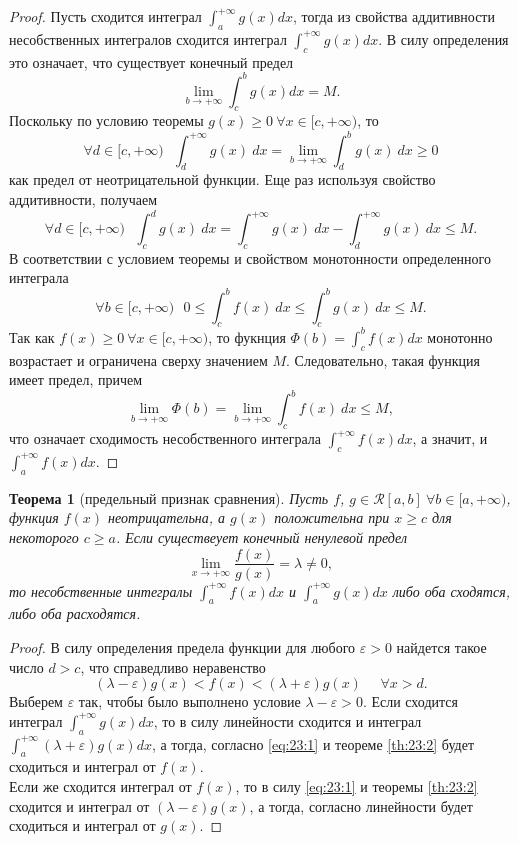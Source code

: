 \documentclass[12pt]{report}
\numberwithin{equation}{section}
\newtheorem{theorem}{Теорема}[section]
\begin{document}
\begin{proof}
Пусть сходится интеграл $\int_a^{+\infty}g(x)dx$, тогда из свойства аддитивности несобственных интегралов сходится интеграл $\int_c^{+\infty}g(x)dx$. В силу определения это означает, что существует конечный предел
\[ \lim_{b \to +\infty}\int_c^b g(x)dx = M.\]
Поскольку по условию теоремы $g(x) \geqslant 0~\forall x \in [c, +\infty)$, то
\[ \forall d \in [c, +\infty)~~~ \int_d^{+\infty} g(x)~dx = \lim_{b \to +\infty} \int_d^b g(x)~dx \geqslant 0\]
как предел от неотрицательной функции. Еще раз используя свойство аддитивности, получаем
\[ \forall d \in [c, +\infty)~~~ \int_c^d g(x)~dx = \int_c^{+\infty} g(x)~dx - \int_d^{+\infty} g(x)~dx \leqslant M.\]
В соответствии с условием теоремы и свойством монотонности определенного интеграла
\[ \forall b \in [c, +\infty)~~~ 0 \leqslant \int_c^b f(x)~dx \leqslant \int_c^b g(x)~dx \leqslant M.\]
Так как $f(x) \geqslant 0~\forall x \in [c,+\infty)$, то фукнция $\Phi(b) = \int_c^b f(x)dx$ монотонно возрастает и ограничена сверху значением $M$. Следовательно, такая функция имеет предел, причем
\[ \lim_{b \to +\infty} \Phi(b) = \lim_{b \to +\infty} \int_c^b f(x)~dx \leqslant M, \]
что означает сходимость несобственного интеграла $\int_c^{+\infty}f(x)dx$, а значит, и $\int_a^{+\infty}f(x)dx$.
\end{proof}

\begin{theorem} [предельный признак сравнения] \label{th:23:3}
Пусть $f$, $g \in \mathcal{R}[a,b]~\forall b \in [a, + \infty)$, функция $f(x)$ неотрицательна, а $g(x)$ положительна при $x \geqslant c$ для некоторого $c \geqslant a$. Если существеует конечный ненулевой предел
\[ \lim_{x \to + \infty} \frac{f(x)}{g(x)} = \lambda \neq 0,\]
то несобственные интегралы $\int_a^{+ \infty} f(x)dx$ и $\int_a^{+ \infty} g(x)dx$ либо оба сходятся, либо оба расходятся.
\end{theorem}
\begin{proof}
 В силу определения предела функции для любого $\varepsilon > 0$ найдется такое  число $d > c$, что справедливо неравенство
\begin{equation} \label {eq:23:1}
(\lambda - \varepsilon) g(x) < f(x) < (\lambda + \varepsilon) g(x)~~~~~~\forall x > d.
\end{equation}
Выберем $\varepsilon$ так, чтобы было выполнено условие $\lambda - \varepsilon > 0$. Если сходится интеграл $\int_a^{+\infty}g(x)dx$, то в силу линейности сходится и интеграл $\int_a^{+\infty}(\lambda + \varepsilon) g(x)dx$, а тогда, согласно \eqref{eq:23:1} и теореме \ref{th:23:2} будет сходиться и интеграл от $f(x)$.\\

Если же сходится интеграл от $f(x)$, то в силу \eqref{eq:23:1} и теоремы \ref{th:23:2} сходится и интеграл от $(\lambda - \varepsilon)g(x)$, а тогда, согласно линейности будет сходиться и интеграл от $g(x)$.
\end{proof}
\end{document}
